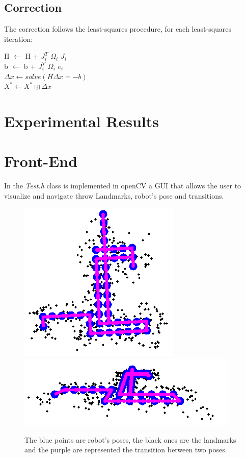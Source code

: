 \documentclass[10pt]{article}
\begin{document}
	\subsection{Correction}
	The correction follows the least-squares procedure, for each least-squares iteration:
	
	H $\leftarrow$ H + $J_{\textit{i}}^{T}$ $\Omega_{\textit{i}}$ $J_{\textit{i}}$	\\
	b $\leftarrow$ b + $J_{\textit{i}}^{T}$ $\Omega_{\textit{i}}$ $e_{\textit{i}}$  \\
	$\Delta x \leftarrow solve(H\Delta x=-b)$\\
	$X^* \leftarrow X^* \boxplus \Delta x$
	\section{Experimental Results}	
	\section{Front-End}
	In the \textit{Test.h} class is implemented in openCV a GUI that allows the user to visualize and navigate throw Landmarks, robot's pose and transitions.
	
	\begin{figure}
		\centering
		\includegraphics[width=0.5\linewidth]{img/exact}
		\includegraphics[width=0.8\linewidth]{img/exact2}
		\caption{The blue points are robot's poses, the black ones are the landmarks and the purple are represented the transition between two poses.}
		\label{fig:exact}
	\end{figure}
	
	
\end{document}
